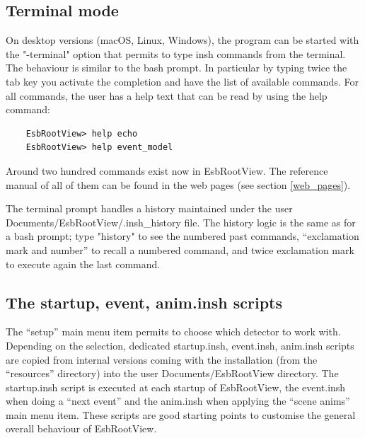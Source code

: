 \documentclass{webofc}
\begin{document}
\subsection{Terminal mode}
On desktop versions (macOS, Linux, Windows), the program can be
started with the "-terminal" option that permits to type insh commands
from the terminal. The behaviour is similar to the bash prompt.
In particular by typing twice the tab key you activate the completion and have the list of available commands.
For all commands, the user has a help text that can be read by using the help command:
\begin{verbatim}
    EsbRootView> help echo
    EsbRootView> help event_model
\end{verbatim}
Around two hundred commands exist now in EsbRootView. The reference manual
of all of them can be found in the web pages (see section \ref{web_pages}).

The terminal prompt handles a history maintained under the user
Documents/EsbRootView/.insh\_history file. The history logic is the
same as for a bash prompt; type "history" to see the numbered past
commands, ``exclamation mark and number'' to recall a numbered command,
and twice exclamation mark to execute again the last command.

 \subsection{The startup, event, anim.insh scripts}
 The ``setup'' main menu item permits to choose which detector to work
 with. Depending on the selection, dedicated startup.insh, event.insh, anim.insh
 scripts are copied from internal versions coming with the
 installation (from the ``resources'' directory) into
 the user Documents/EsbRootView directory. The startup.insh script is
 executed at each startup of EsbRootView, the event.insh when doing a
 ``next event'' and the anim.insh when applying the ``scene anims''
 main menu item. These scripts are good starting points to customise
 the general overall behaviour of EsbRootView. 
\end{document}

